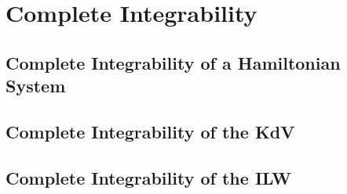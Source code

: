 \documentclass[GreensFunctions.tex]{subfiles}
\begin{document}
\section{Complete Integrability}\label{sec0:Lax}

\subsection{Complete Integrability of a Hamiltonian System}

\subsection{Complete Integrability of the KdV}

\subsection{Complete Integrability of the ILW}
\end{document}
